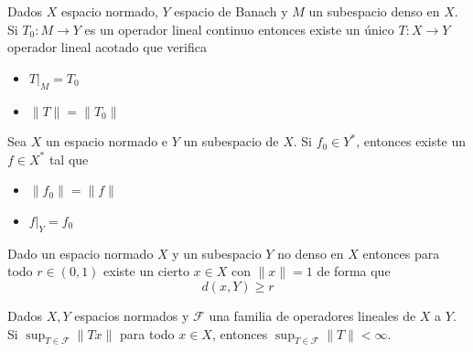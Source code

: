 			\begin{theorem}\label{th:ext-hahn-Banach}
				Dados $X$ espacio normado, $Y$ espacio de Banach y $M$ un subespacio denso en $X$. Si $T_0 \colon M \to Y$ es un operador lineal continuo entonces existe un único $T:X \to Y$ operador lineal acotado que verifica
				\begin{itemize}
					\item[(i)] $T|_{M} = T_0$
					\item[(ii)] $\|T\| = \|T_0\|$ 
				\end{itemize}
			\end{theorem}
			
			\begin{theorem}\label{th:Hahn-Banach-funcionales}
				Sea $X$ un espacio normado e $Y$ un subespacio de $X$. Si $f_0\in Y^*$, entonces existe un $f\in X^*$ tal que 
				\begin{itemize}
					\item[$(i)$] $\|f_0\| = \|f\|$
					\item[$(ii)$] $f|_Y = f_0$ 
				\end{itemize}
				
			\end{theorem}
			
			\begin{lemma}\label{lm:riesz}
				Dado un espacio normado $X$ y un subespacio $Y$ no denso en $X$ entonces para todo $r \in (0,1)$ existe un cierto $x \in X$ con $\|x\| = 1$ de forma que
				$$d(x,Y) \geq r$$
				
			\end{lemma}
			
			\begin{theorem}\label{th:acotacion-uniforme-banach-steinhaus}
				Dados $X,Y$ espacios normados y $\mathcal{F}$ una familia de operadores lineales de $X$ a $Y$. Si $\sup_{T\in\mathcal{F}}\|Tx\|$ para todo $x\in X$, entonces $\sup_{T\in \mathcal{F}}\|T\|<\infty$.
			\end{theorem}
	
	
%	
%	
%	

